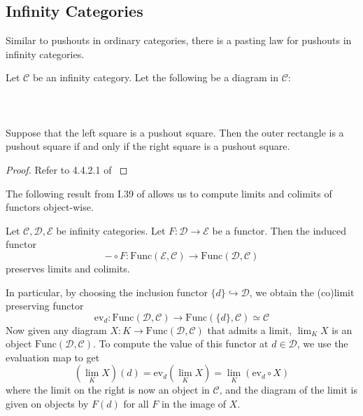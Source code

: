 \subsection{Infinity Categories}
Similar to pushouts in ordinary categories, there is a pasting law for pushouts in infinity categories. 

\begin{prp}\label{prp:Pasting3} Let $\mathcal{C}$ be an infinity category. Let the following be a diagram in $\mathcal{C}$: \\~\\
\\~\\
Suppose that the left square is a pushout square. Then the outer rectangle is a pushout square if and only if the right square is a pushout square. 
\begin{proof}
Refer to 4.4.2.1 of \cite{HTT}
\end{proof}
\end{prp}

The following result from I.39 of \cite{AHKT} allows us to compute limits and colimits of functors object-wise. 

\begin{prp}\label{prp:TermwiseLim} Let $\mathcal{C},\mathcal{D},\mathcal{E}$ be infinity categories. Let $F:\mathcal{D}\to\mathcal{E}$ be a functor. Then the induced functor $$-\circ F:\text{Func}(\mathcal{E},\mathcal{C})\to\text{Func}(\mathcal{D},\mathcal{C})$$ preserves limits and colimits. 
\end{prp}

In particular, by choosing the inclusion functor $\{d\}\hookrightarrow\mathcal{D}$, we obtain the (co)limit preserving functor $$\text{ev}_d:\text{Func}(\mathcal{D},\mathcal{C})\to\text{Func}(\{d\},\mathcal{C})\simeq\mathcal{C}$$ Now given any diagram $X:K\to\text{Func}(\mathcal{D},\mathcal{C})$ that admits a limit, $\lim_K X$ is an object $\text{Func}(\mathcal{D},\mathcal{C})$. To compute the value of this functor at $d\in\mathcal{D}$, we use the evaluation map to get $$\left(\lim_K X\right)(d)=\text{ev}_d\left(\lim_KX\right)=\lim_K(\text{ev}_d\circ X)$$ where the limit on the right is now an object in $\mathcal{C}$, and the diagram of the limit is given on objects by $F(d)$ for all $F$ in the image of $X$. 

